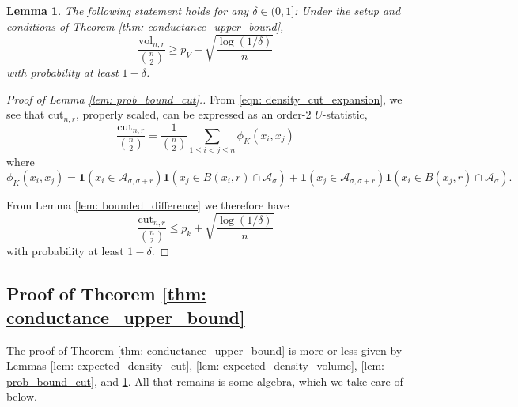 \documentclass{article}
\newcommand{\vol}{\mathrm{vol}}
\newcommand{\1}{\mathbf{1}}
\newcommand{\cut}{\mathrm{cut}}
\newcommand{\Aset}{\mathcal{A}}
\newcommand{\Asig}{\Aset_{\sigma}}
\newcommand{\Asigr}{\Aset_{\sigma,\sigma + r}}
\theoremstyle{aldenthm}
\newtheorem{lemma}{Lemma}
\begin{document}
\begin{lemma}
	\label{lem: prob_bound_vol}
	The following statement holds for any $\delta \in (0,1]$: Under the setup and conditions of Theorem \ref{thm: conductance_upper_bound}, 
	\begin{equation}
	\label{eqn: denominator_additive_bound}
	\frac{\vol_{n,r}}{{n \choose 2}} \geq p_V - \sqrt{\frac{\log(1/\delta)}{n}}
	\end{equation}
	with probability at least $1 - \delta$. 
\end{lemma}

\begin{proof}[Proof of Lemma \ref{lem: prob_bound_cut}.]
	From \eqref{eqn: density_cut_expansion}, we see that $\cut_{n,r}$, properly scaled, can be expressed as an order-$2$ $U$-statistic,
	\begin{equation*}
	\frac{\cut_{n,r}}{{n \choose 2}} = \frac{1}{{n \choose 2}} \sum_{1 \leq i < j \leq n} \phi_K(x_i, x_j)
	\end{equation*}
	where 
	\begin{equation*}
	\phi_K(x_i,x_j) = \1(x_i \in \Asigr) \1(x_j \in B(x_i,r) \cap \Asig) + \1(x_j \in \Asigr) \1(x_i \in B(x_j,r) \cap \Asig).
	\end{equation*}
	
	From Lemma \ref{lem: bounded_difference} we therefore have
	\begin{equation*}
	\frac{\cut_{n,r}}{{n \choose 2}} \leq p_k + \sqrt{\frac{\log(1/\delta)}{n}}
	\end{equation*}
	with probability at least $1 - \delta$. 
\end{proof}

\subsection{Proof of Theorem \ref{thm: conductance_upper_bound}}
The proof of Theorem \ref{thm: conductance_upper_bound} is more or less given by Lemmas \ref{lem: expected_density_cut}, \ref{lem: expected_density_volume}, \ref{lem: prob_bound_cut}, and \ref{lem: prob_bound_vol}. All that remains is some algebra, which we take care of below.
\end{document}

